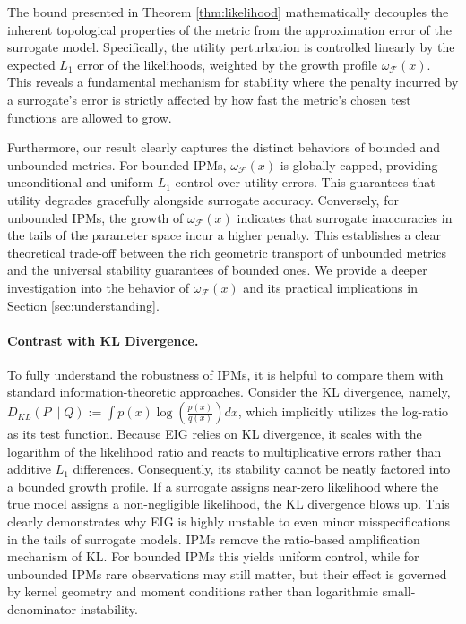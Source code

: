 \documentclass[twoside,11pt]{article}
\begin{document}
The bound presented in Theorem \ref{thm:likelihood} mathematically decouples the inherent topological properties of the metric from the approximation error of the surrogate model. Specifically, the utility perturbation is controlled linearly by the expected $L_1$ error of the likelihoods, weighted by the growth profile $\omega_{\mathcal{F}}(x)$. This reveals a fundamental mechanism for stability where the penalty incurred by a surrogate's error is strictly affected by how fast the metric's chosen test functions are allowed to grow.

Furthermore, our result clearly captures the distinct behaviors of bounded and unbounded metrics. For bounded IPMs, $\omega_{\mathcal{F}}(x)$ is globally capped, providing unconditional and uniform $L_1$ control over utility errors. This guarantees that utility degrades gracefully alongside surrogate accuracy. Conversely, for unbounded IPMs, the growth of $\omega_{\mathcal{F}}(x)$ indicates that surrogate inaccuracies in the tails of the parameter space incur a higher penalty. This establishes a clear theoretical trade-off between the rich geometric transport of unbounded metrics and the universal stability guarantees of bounded ones. We provide a deeper investigation into the behavior of $\omega_{\mathcal{F}}(x)$ and its practical implications in Section \ref{sec:understanding}.

\paragraph{Contrast with KL Divergence.}  To fully understand the robustness of IPMs, it is helpful to compare them with standard information-theoretic approaches. Consider the KL divergence, namely, $D_{KL}(P\|Q) := \int p(x) \log\left(\frac{p(x)}{q(x)}\right) dx$, which implicitly utilizes the log-ratio as its test function. Because EIG relies on KL divergence, it scales with the logarithm of the likelihood ratio and reacts to multiplicative errors rather than additive $L_1$ differences. Consequently, its stability cannot be neatly factored into a bounded growth profile. If a surrogate assigns near-zero likelihood where the true model assigns a non-negligible likelihood, the KL divergence blows up. This clearly demonstrates why EIG is highly unstable to even minor misspecifications in the tails of surrogate models. IPMs remove the ratio-based amplification mechanism of KL. For bounded IPMs this yields uniform control, while for unbounded IPMs rare observations may still matter, but their effect is governed by kernel geometry and moment conditions rather than logarithmic small-denominator instability.
\end{document}
